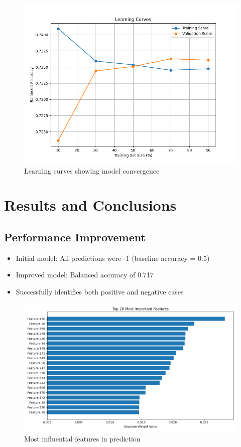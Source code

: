 \documentclass[10pt,conference,compsocconf]{IEEEtran}
\begin{document}
\begin{figure}[h]
    \centering
    \includegraphics[width=0.8\linewidth]{figures/learning_curves.png}
    \caption{Learning curves showing model convergence}
    \label{fig:learning_curves}
\end{figure}

\section{Results and Conclusions}

\subsection{Performance Improvement}
\begin{itemize}
    \item Initial model: All predictions were -1 (baseline accuracy = 0.5)
    \item Improved model: Balanced accuracy of 0.717
    \item Successfully identifies both positive and negative cases
\end{itemize}

\begin{figure}[h]
    \centering
    \includegraphics[width=0.8\linewidth]{figures/feature_importance.png}
    \caption{Most influential features in prediction}
    \label{fig:feature_importance}
\end{figure}
\end{document}
